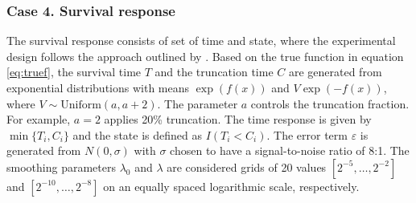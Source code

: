 \hypertarget{case-4.-survival-response}{%
\subsubsection{Case 4. Survival response}\label{case-4.-survival-response}}

The survival response consists of set of time and state, where the experimental design follows the approach outlined by \citet{Leng:2006}. Based on the true function in equation \eqref{eq:truef}, the survival time \(T\) and the truncation time \(C\) are generated from exponential distributions with means \(\exp(f(x))\) and \(V \exp(-f(x))\), where \(V \sim \text{Uniform}(a, a+2)\). The parameter \(a\) controls the truncation fraction. For example, \(a=2\) applies 20\% truncation. The time response is given by \(\min\{T_i, C_i\}\) and the state is defined as \(I(T_i < C_i)\). The error term \(\varepsilon\) is generated from \(N(0, \sigma)\) with \(\sigma\) chosen to have a signal-to-noise ratio of 8:1. The smoothing parameters \(\lambda_0\) and \(\lambda\) are considered grids of 20 values \([2^{-5}, \dots, 2^{-2}]\) and \([2^{-10}, \dots, 2^{-8}]\) on an equally spaced logarithmic scale, respectively.

